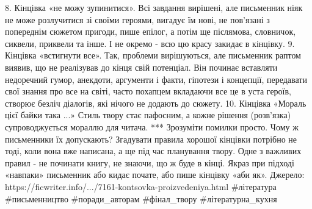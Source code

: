 8. Кінцівка «не можу зупинитися».
Всі завдання вирішені, але письменник ніяк не може розлучитися зі своїми героями, вигадує їм нові, не пов'язані з попереднім сюжетом пригоди, пише епілог, а потім ще післямова, словничок, сиквели, приквели та інше. І не окремо - всю цю красу закидає в кінцівку.
9. Кінцівка «встигнути все».
Так, проблеми вирішуються, але письменник раптом виявив, що не реалізував до кінця свій потенціал. Він починає вставляти недоречний гумор, анекдоти, аргументи і факти, гіпотези і концепції, передавати свої знання про все на світі, часто похапцем вкладаючи все це в уста героїв, створює безліч діалогів, які нічого не додають до сюжету.
10. Кінцівка «Мораль цієї байки така ...» Стиль твору стає пафосним, а кожне рішення (розв'язка) супроводжується мораллю для читача.
***
Зрозуміти помилки просто. Чому ж письменники їх допускають? Згадувати правила хорошої кінцівки потрібно не тоді, коли вона вже написана, а ще під час планування твору. Одне з важливих правил - не починати книгу, не знаючи, що ж буде в кінці. Якраз при підході «навпаки» письменник або кидає почате, або пише кінцівку «аби як».
Джерело:
https://ficwriter.info/.../7161-kontsovka-proizvedeniya.html
#література #письменництво #поради_авторам #фінал_твору #літературна_кухня
